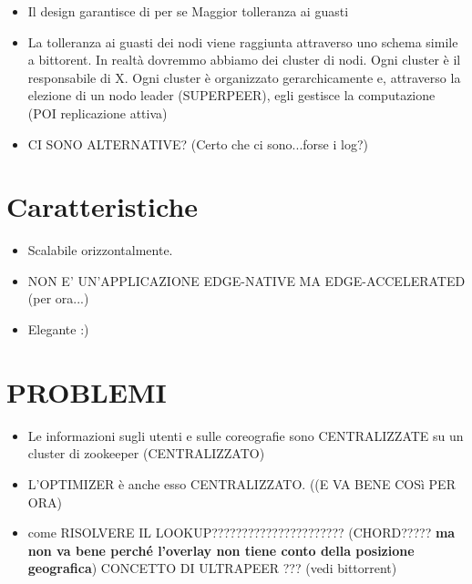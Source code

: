 \documentclass[10pt,a4paper]{report}
\begin{document}
\begin{itemize}
\item Il design garantisce di per se Maggior tolleranza ai guasti

\item La tolleranza ai guasti dei nodi viene raggiunta attraverso uno schema simile a bittorent. In realtà dovremmo abbiamo dei cluster di nodi. Ogni cluster è il responsabile di X. Ogni cluster è organizzato gerarchicamente e, attraverso la elezione di un nodo leader (SUPERPEER), egli gestisce la computazione (POI replicazione attiva)

\item CI SONO ALTERNATIVE? (Certo che ci sono...forse i log?)
\end{itemize}


\section{Caratteristiche}

\begin{itemize}
\item Scalabile orizzontalmente.

\item NON E' UN'APPLICAZIONE EDGE-NATIVE MA EDGE-ACCELERATED (per ora...)

\item Elegante :) 

\end{itemize}

\section{PROBLEMI}


\begin{itemize}
\item Le informazioni sugli utenti e sulle coreografie sono CENTRALIZZATE su un cluster di zookeeper (CENTRALIZZATO)

\item L'OPTIMIZER è anche esso CENTRALIZZATO. ((E VA BENE COSì PER ORA)

\item come RISOLVERE IL LOOKUP?????????????????????? (CHORD????? \textbf{ma non va bene perché l'overlay non tiene conto della posizione geografica})  CONCETTO DI ULTRAPEER ??? (vedi bittorrent)
\end{itemize}
\end{document}
